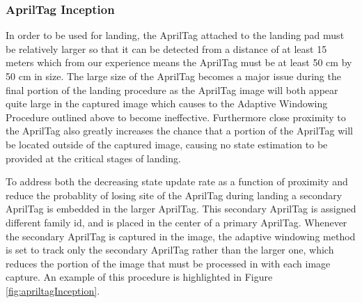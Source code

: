 \documentclass[11pt, twocolumn]{article}
\begin{document}
\subsubsection{AprilTag Inception}
 In order to be used for landing, the AprilTag attached to the landing pad must be relatively larger so that it can be detected from a distance of at least 15 meters which from our experience means the AprilTag must be at least 50 cm by 50 cm in size. The large size of the AprilTag becomes a major issue during the final portion of the landing procedure as the AprilTag image will both appear quite large in the captured image which causes to the Adaptive Windowing Procedure outlined above to become ineffective. Furthermore close proximity to the AprilTag also greatly increases the chance that a portion of the AprilTag will be located outside of the captured image, causing no state estimation to be provided at the critical stages of landing. 
 
To address both the decreasing state update rate as a function of proximity and reduce the probablity of losing site of the AprilTag during landing a secondary AprilTag is embedded in the larger AprilTag. This secondary AprilTag is assigned different family id, and is placed in the center of a primary AprilTag. Whenever the secondary AprilTag is captured in the image, the adaptive windowing method is set to track only the secondary AprilTag rather than the larger one, which reduces the portion of the image that must be processed in with each image capture. An example of this procedure is highlighted in Figure \ref{fig:apriltagInception}.
\end{document}
